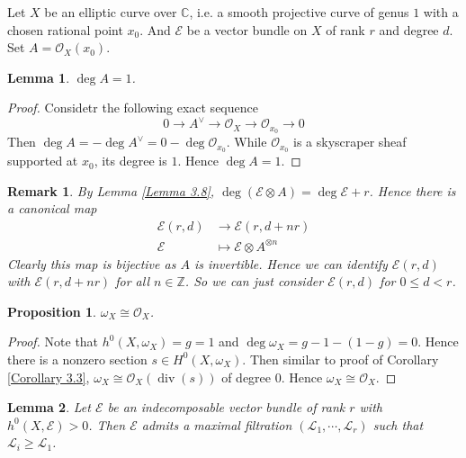 \documentclass{ctexart}
\newtheorem{remark}{Remark}[section]
\newtheorem{proposition}{Proposition}[section]
\newtheorem{lemma}{Lemma}[section]
\newcommand{\divisor}{\operatorname{div}}
\begin{document}
Let $X$ be an elliptic curve over $\mathbb{C}$, i.e. a smooth projective curve of genus $1$ with a chosen rational point $x_{0}$.
And $\mathcal{E}$ be a vector bundle on $X$ of rank $r$ and degree $d$.
Set $A = \mathcal{O}_{X}(x_{0})$.
\begin{lemma}
    $\deg A = 1$.
    \label{Lemma 5.8}
\end{lemma}
\begin{proof}
    Considetr the following exact sequence
    \begin{equation}
        0 \longrightarrow A^{\vee} \longrightarrow \mathcal{O}_{X} \longrightarrow \mathcal{O}_{x_{0}} \longrightarrow 0
    \end{equation}
    Then $\deg A = -\deg A^{\vee} = 0 - \deg \mathcal{O}_{x_{0}}$.
    While $\mathcal{O}_{x_{0}}$ is a skyscraper sheaf supported at $x_{0}$, its degree is $1$.
    Hence $\deg A = 1$.
\end{proof}
\begin{remark}
    By Lemma \ref{Lemma 3.8}, $\deg (\mathcal{E} \otimes A) = \deg \mathcal{E} + r$.
    Hence there is a canonical map
    \begin{equation}
        \begin{split}
            \mathcal{E}(r, d) & \longrightarrow \mathcal{E}(r, d + nr) \\
            \mathcal{E} & \longmapsto \mathcal{E} \otimes A^{\otimes n}
        \end{split}
    \end{equation}
    Clearly this map is bijective as $A$ is invertible.
    Hence we can identify $\mathcal{E}(r, d)$ with $\mathcal{E}(r, d + nr)$ for all $n\in \mathbb{Z}$.
    So we can just consider $\mathcal{E}(r, d)$ for $0 \le d < r$.
\end{remark}
\begin{proposition}
    $\omega_{X} \cong \mathcal{O}_{X}$.
    \label{Proposition 5.2}
\end{proposition}
\begin{proof}
    Note that $h^{0}(X, \omega_{X}) = g = 1$ and $\deg \omega_{X} = g - 1 - (1 - g) = 0$.
    Hence there is a nonzero section $s\in H^{0}(X, \omega_{X})$.
    Then similar to proof of Corollary \ref{Corollary 3.3}, $\omega_{X} \cong \mathcal{O}_{X}(\divisor (s))$ of degree $0$.
    Hence $\omega_{X} \cong \mathcal{O}_{X}$.
\end{proof}
\begin{lemma}
    Let $\mathcal{E}$ be an indecomposable vector bundle of rank $r$ with $h^{0}(X, \mathcal{E}) > 0$.
    Then $\mathcal{E}$ admits a maximal filtration $(\mathcal{L}_{1}, \cdots, \mathcal{L}_{r})$ such that $\mathcal{L}_{i} \ge \mathcal{L}_{1}$.
    \label{Lemma 5.9}
\end{lemma}
\end{document}
